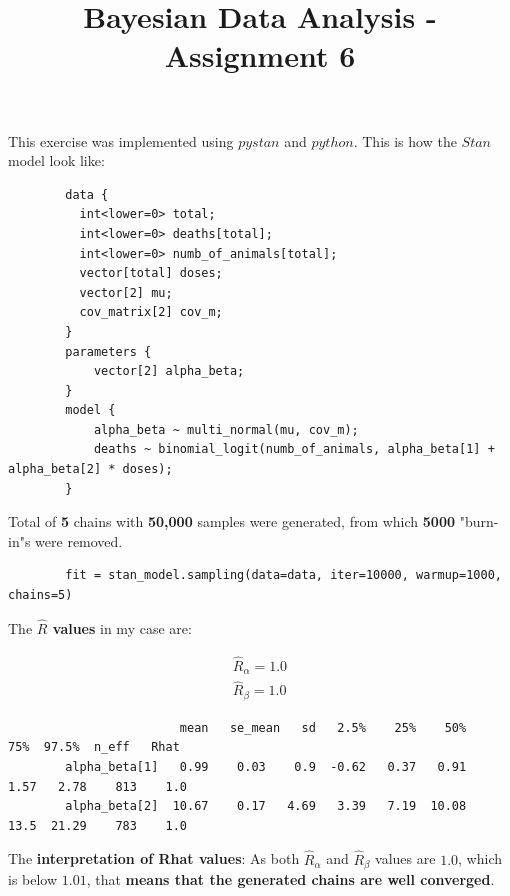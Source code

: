 \documentclass[11pt,a4paper,english]{article}
\title{Bayesian Data Analysis - Assignment 6}
\author{}
\begin{document}
        \maketitle

      This exercise was implemented using $pystan$ and $python$. This is how the $Stan$ model look like:
      \begin{verbatim}
        data {
          int<lower=0> total;
          int<lower=0> deaths[total];
          int<lower=0> numb_of_animals[total];
          vector[total] doses;
          vector[2] mu;
          cov_matrix[2] cov_m;
        }
        parameters {
            vector[2] alpha_beta;
        }
        model {
            alpha_beta ~ multi_normal(mu, cov_m);
            deaths ~ binomial_logit(numb_of_animals, alpha_beta[1] + alpha_beta[2] * doses);
        }
      \end{verbatim}

      Total of \textbf{5} chains with \textbf{50,000} samples were generated, from which \textbf{5000} "burn-in"s were removed.
      \begin{verbatim}
        fit = stan_model.sampling(data=data, iter=10000, warmup=1000, chains=5)
      \end{verbatim}

      The \textbf{$\widehat{R}$ values} in my case are:

      \begin{align*}
        \widehat{R}_{\alpha} = 1.0 \\
        \widehat{R}_{\beta} = 1.0
      \end{align*}

      \begin{verbatim}
                        mean   se_mean   sd   2.5%    25%    50%    75%  97.5%  n_eff   Rhat
        alpha_beta[1]   0.99    0.03    0.9  -0.62   0.37   0.91   1.57   2.78    813    1.0
        alpha_beta[2]  10.67    0.17   4.69   3.39   7.19  10.08   13.5  21.29    783    1.0
      \end{verbatim}

      The \textbf{interpretation of Rhat values}: As both $\widehat{R}_{\alpha}$ and $\widehat{R}_{\beta}$ values are $1.0$, which is below $1.01$, that \textbf{means that the generated chains are well converged}.
\end{document}
